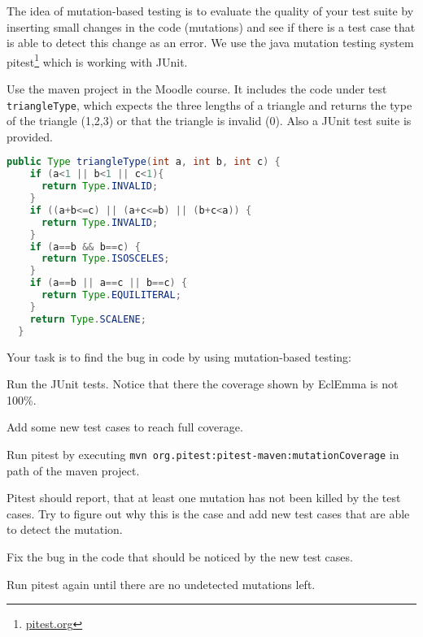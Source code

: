 \documentclass[language=en,sheet=2,prefix]{exercise}
\begin{document}

The idea of mutation-based testing is to evaluate the quality of your test suite by inserting small changes in the code (mutations) and see if there is a test case that is able to detect this change as an error. We use the java mutation testing system pitest\footnote{\url{pitest.org}} which is working with JUnit.

Use the maven project in the Moodle course. It includes the code under test \lstinline-triangleType-, which expects the three lengths of a triangle and returns the type of the triangle (1,2,3) or that the triangle is invalid (0). Also a JUnit test suite is provided.  

\begin{lstlisting}[language=Java,gobble=2]
  public Type triangleType(int a, int b, int c) {
    if (a<1 || b<1 || c<1){
      return Type.INVALID;
    }
    if ((a+b<=c) || (a+c<=b) || (b+c<a)) {
      return Type.INVALID;
    }
    if (a==b && b==c) {
      return Type.ISOSCELES;
    }
    if (a==b || a==c || b==c) {
      return Type.EQUILITERAL;
    }
    return Type.SCALENE;
  }
\end{lstlisting}


Your task is to find the bug in code by using mutation-based testing:

\begin{compactenum}
	\item Run the JUnit tests. Notice that there the coverage shown by EclEmma is not 100\%.
	\item Add some new test cases to reach full coverage.
	\item Run pitest by executing \texttt{mvn org.pitest:pitest-maven:mutationCoverage} in path of the maven project.
	\item Pitest should report, that at least one mutation has not been killed by the test cases. Try to figure out why this is the case and add new test cases that are able to detect the mutation.
	\item Fix the bug in the code that should be noticed by the new test cases.
	\item Run pitest again until there are no undetected mutations left.
\end{compactenum}
\end{document}
